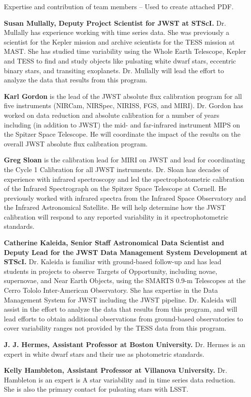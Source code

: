Expertise and contribution of team members -- Used to create attached PDF.

\textbf{Susan Mullally, Deputy Project Scientist for JWST at STScI.} Dr. Mullally has experience working with time series data. She was previously a scientist for the Kepler mission and archive scientists for the TESS mission at MAST.  She has studied time variability using the Whole Earth Telescope, Kepler and TESS to find and study objects like pulsating white dwarf stars, eccentric binary stars, and transiting exoplanets.  Dr. Mullally will lead the effort to analyze the data that results from this program.


\textbf{Karl Gordon} is the lead of the JWST absolute flux calibration program for all five instruments (NIRCam, NIRSpec, NIRISS, FGS, and MIRI).  Dr. Gordon has worked on data reduction and absolute calibration for a number of years including (in addition to JWST) the mid- and far-infrared instrument MIPS on the Spitzer Space Telescope.  He will coordinate the impact of the results on the overall JWST absolute flux calibration program.


\textbf{Greg Sloan} is the calibration lead for MIRI on JWST and lead for coordinating the Cycle 1 Calibration for all JWST instruments.  Dr. Sloan has decades of experience with infrared spectroscopy and led the spectrophotometric calibration of the Infrared Spectrograph on the Spitzer Space Telescope at Cornell.  He previously worked with infrared spectra from the Infrared Space Observatory and the Infrared Astronomical Satellite.  He will help determine how the JWST calibration will respond to any reported variability in it spectrophotometric standards.


\textbf{Catherine Kaleida, Senior Staff Astronomical Data Scientist and Deputy Lead for the JWST Data Management System Development at  STScI.}  Dr. Kaleida is familiar with ground-based follow-up and has lead students in projects to observe Targets of Opportunity, including novae, supernovae, and Near Earth Objects, using the SMARTS 0.9-m Telescopes at the Cerro Tololo Inter-American Observatory.  She has expertise in the Data Management System for JWST including the JWST pipeline. Dr. Kaleida will assist in the effort to analyze the data that results from this program, and will lead efforts to obtain additional observations from ground-based observatories to cover variability ranges not provided by the TESS data from this program.

\textbf{J. J. Hermes, Assistant Professor at Boston University.} Dr. Hermes is an expert in white dwarf stars and their use as photometric standards.  

\textbf{Kelly Hambleton, Assistant Professor at Villanova University.} Dr. Hambleton is an expert is A star variability and in time series data reduction. She is also the primary contact for pulsating stars with LSST.

